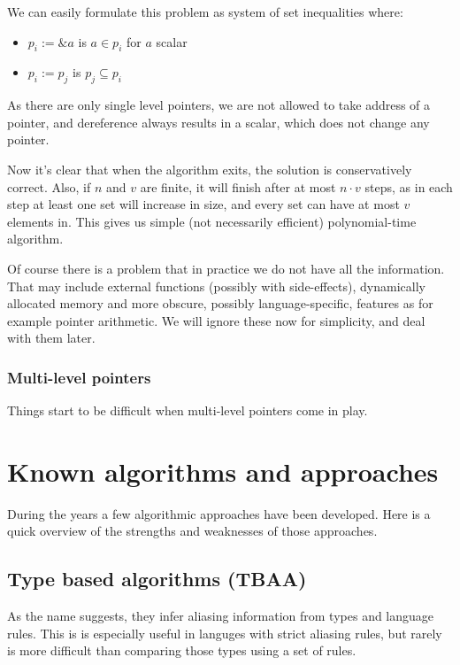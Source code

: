 We can easily formulate this problem as system of set inequalities where:

\begin{itemize}
	\item $p_i := \&a$ is $a \in p_i$ for $a$ scalar
	\item $p_i := p_j$ is $p_j \subseteq p_i$
\end{itemize}

As there are only single level pointers, we are not allowed to take address of a
pointer, and dereference always results in a scalar, which does not change any
pointer.

Now it's clear that when the algorithm exits, the solution is conservatively
correct. Also, if $n$ and $v$ are finite, it will finish after at most $n \cdot
v$ steps, as in each step at least one set will increase in size, and every set
can have at most $v$ elements in.
This gives us simple (not necessarily efficient) polynomial-time algorithm.

Of course there is a problem that in practice we  do not have all the information.
That may include external functions (possibly with side-effects), dynamically
allocated memory and more obscure, possibly language-specific, features as for
example pointer arithmetic. We will ignore these now for simplicity, and
deal with them later. 

\subsubsection{Multi-level pointers}

Things start to be difficult when multi-level pointers come in play. 

\section{Known algorithms and approaches}

During the years a few algorithmic approaches have been developed. Here is a
quick overview of the strengths and weaknesses of those approaches.

\subsection{Type based algorithms (TBAA)}

As the name suggests, they infer aliasing information from types and language
rules. This is is especially useful in languges with strict aliasing rules, but
rarely is more difficult than comparing those types using a set of rules. 

